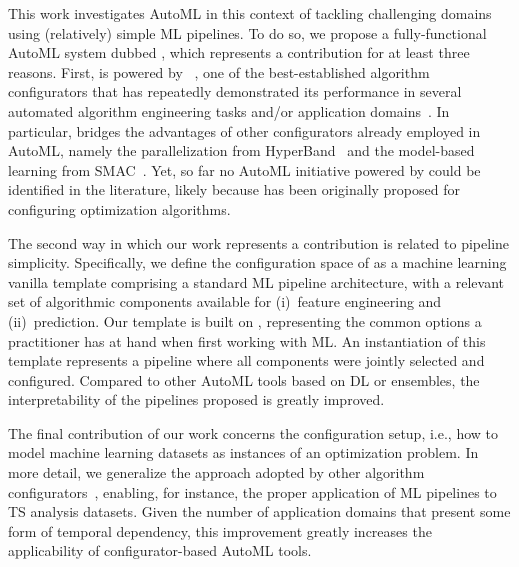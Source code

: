 This work investigates AutoML in this context of tackling challenging domains using (relatively) simple ML pipelines. To do so, we propose a fully-functional AutoML system dubbed \isklearn, which represents a contribution for at least three reasons. First, \isklearn is powered by \irace~\cite{lopez2016irace}, one of the best-established algorithm configurators that has repeatedly demonstrated its performance in several automated algorithm engineering tasks and/or application domains~\cite{BezerraPhD,BezLopStu2020}. In particular, \irace bridges the advantages of other configurators already employed in AutoML, namely the parallelization from HyperBand~\cite{li2017hyperband} and the model-based learning from SMAC~\cite{smac}. Yet, so far no AutoML initiative powered by \irace could be identified in the literature, likely because \irace has been originally proposed for configuring optimization algorithms. 

The second way in which our work represents a contribution is related to pipeline simplicity. Specifically, 
we define the configuration space of \isklearn as a machine learning vanilla template comprising a standard ML pipeline architecture, with a relevant set of algorithmic components available for (i)~feature engineering and (ii)~prediction. Our template is built on \sklearn, representing the common options a practitioner has at hand when first working with ML. An instantiation of this template represents a pipeline where all components were jointly selected and configured. Compared to other AutoML tools based on DL or ensembles, the interpretability of the pipelines proposed is greatly improved.

The final contribution of our work concerns the configuration setup, i.e., how to model machine learning datasets as instances of an optimization problem. In more detail, we generalize the approach adopted by other algorithm configurators~\cite{auto-sklearn,autoweka}, enabling, for instance, the proper application of ML pipelines to TS analysis datasets. Given the number of application domains that present some form of temporal dependency, this improvement greatly increases the applicability of configurator-based AutoML tools.

